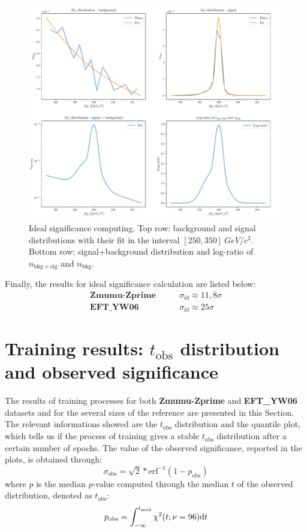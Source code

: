 \begin{figure}[H]
	\centering
	\includegraphics[width=1.0\textwidth]{Python/RESULTS/ID_SIG/id_sig_Zmumu_Zprime.pdf}
	\caption{Ideal significance computing. Top row: background and signal distributions with their fit in the interval $[250,350]~\si{GeV/c^2}$. Bottom row: signal+background distribution and log-ratio of $n_\mathrm{bkg+sig}$ and $n_\mathrm{bkg}$.}
	\label{fig:ID_SIG_ZMUMU_ZPRIME}
\end{figure}

Finally, the results for ideal significance calculation are listed below:
\begin{align*}
	\textbf{Zmumu-Zprime}	&	\qquad	\sigma_\mathrm{id} \approx 11,8\sigma	\\
	\textbf{EFT\_YW06}		&	\qquad	\sigma_\mathrm{id} \approx 25\sigma		
\end{align*}





\section{Training results: $t_\mathrm{obs}$ distribution and observed significance}
The results of training processes for both \textbf{Zmumu-Zprime} and \textbf{EFT\_YW06} datasets and for the several sizes of the reference are presented in this Section. The relevant informations showed are the $t_\mathrm{obs}$ distribution and the quantile plot, which tells us if the process of training gives a stable $t_\mathrm{obs}$ distribution after a certain number of epochs. The value of the observed significance, reported in the plots, is obtained through:
\begin{equation}
	\sigma_\mathrm{obs} = \sqrt{2} * \operatorname{erf^{-1}}(1-p_\mathrm{obs})
\end{equation}
where $p$ is the median $p$-value computed through the median $t$ of the observed distribution, denoted as $t_\mathrm{obs}$:
\begin{equation}
	p_\mathrm{obs} = \int_{-\infty}^{t_\mathrm{med}} \chi^2(t;\nu=96) \mathrm{d} t
\end{equation}


